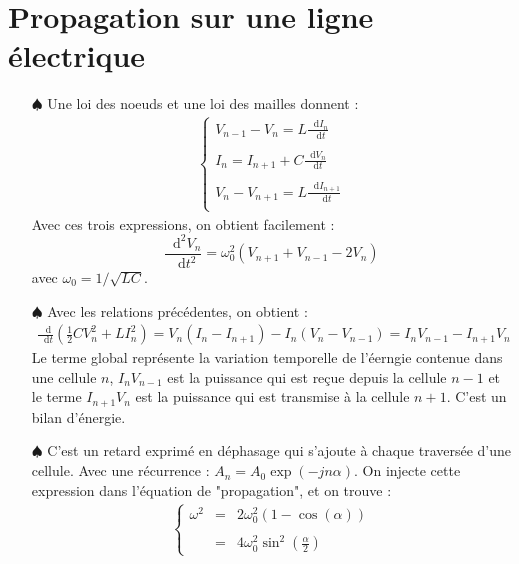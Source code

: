 \documentclass{report}
\newcommand*\dif{\mathop{}\!\mathrm{d}}
\begin{document}
\section*{Propagation sur une ligne électrique}

\begin{itemize}

	\item[$\spadesuit$] Une loi des noeuds et une loi des mailles donnent : 
	\begin{align*}
	\left\lbrace
	\begin{array}{ccc}
	V_{n-1}-V_{n}=L\frac{\dif I_{n}}{\dif t}\\
	\\
	I_{n}=I_{n+1}+C\frac{\dif V_{n}}{\dif t}\\
	\\
	V_{n}-V_{n+1}=L\frac{\dif I_{n+1}}{\dif t}\\
	\end{array}\right.
	\end{align*}		
	Avec ces trois expressions, on obtient facilement :
	\begin{equation}
		\frac{\dif^2 V_n}{\dif t^2} =\omega_0^2(V_{n+1}+V_{n-1}-2V_n)
		\label{eq:prop}
	\end{equation}
	avec $\omega_0=1/\sqrt{LC}$.
	 \item[$\spadesuit$] Avec les relations précédentes, on obtient : 
	 \begin{align*}
	 \frac{\dif}{\dif t}\left( \frac{1}{2}CV_n^2 + LI_n^2 \right) =V_n(I_{n}-I_{n+1})- I_n(V_{n}-V_{n-1})=I_nV_{n-1}-I_{n+1}V_n
	 \end{align*}
	 Le terme global représente la variation temporelle de l'éerngie contenue dans une cellule $n$, $I_nV_{n-1}$ est la puissance qui est reçue depuis la cellule $n-1$ et le terme $I_{n+1}V_n$ est la puissance qui est transmise à la cellule $n+1$. C'est un bilan d'énergie.
	 
	\item[$\spadesuit$] C'est un retard exprimé en déphasage qui s'ajoute à chaque traversée d'une cellule. Avec une récurrence : $A_n=A_0\exp(-jn\alpha)$. On injecte cette expression dans l'équation de "propagation", et on trouve :
	\begin{align*}
	\left\lbrace
	\begin{array}{ccc}
	\omega^2&=&2\omega_0^2(1-\cos(\alpha)) \\
	\\
	& =  &4\omega_0^2\sin^2\left(\frac{\alpha}{2}\right) 
	\end{array}\right.
	\end{align*}	


\end{itemize}
\end{document}
